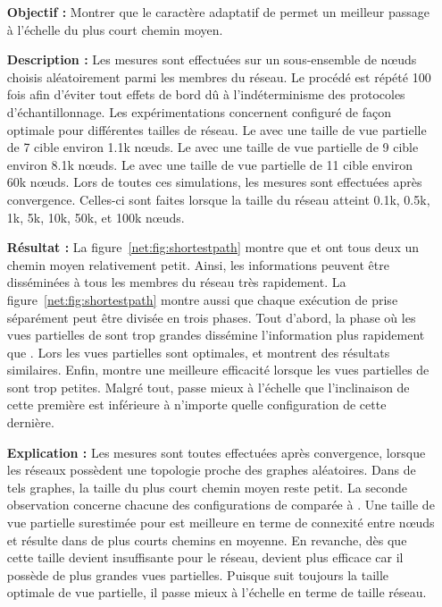 \begin{itemize}
\item [\textbf{Objectif :}] Montrer que le caractère adaptatif de \SPRAY permet
  un meilleur passage à l'échelle du plus court chemin moyen.
\item [\textbf{Description :}] Les mesures sont effectuées sur un sous-ensemble
  de nœuds choisis aléatoirement parmi les membres du réseau. Le procédé est
  répété 100 fois afin d'éviter tout effets de bord dû à l'indéterminisme des
  protocoles d'échantillonnage. Les expérimentations concernent \CYCLON
  configuré de façon optimale pour différentes tailles de réseau. Le \CYCLON
  avec une taille de vue partielle de 7 cible environ 1.1k nœuds. Le \CYCLON
  avec une taille de vue partielle de 9 cible environ 8.1k nœuds. Le \CYCLON
  avec une taille de vue partielle de 11 cible environ 60k nœuds. Lors de toutes
  ces simulations, les mesures sont effectuées après convergence. Celles-ci sont
  faites lorsque la taille du réseau atteint 0.1k, 0.5k, 1k, 5k, 10k, 50k, et
  100k nœuds.
\item [\textbf{Résultat :}] La figure~\ref{net:fig:shortestpath} montre que
  \CYCLON et \SPRAY ont tous deux un chemin moyen relativement petit. Ainsi, les
  informations peuvent être disséminées à tous les membres du réseau très
  rapidement. La figure~\ref{net:fig:shortestpath} montre aussi que chaque
  exécution de \CYCLON prise séparément peut être divisée en trois phases.  Tout
  d'abord, la phase où les vues partielles de \CYCLON sont trop grandes
  dissémine l'information plus rapidement que \SPRAY. Lors les vues partielles
  sont optimales, \CYCLON et \SPRAY montrent des résultats similaires. Enfin,
  \SPRAY montre une meilleure efficacité lorsque les vues partielles de \CYCLON
  sont trop petites. Malgré tout, \SPRAY passe mieux à l'échelle que \CYCLON
  l'inclinaison de cette première est inférieure à n'importe quelle
  configuration de cette dernière.
\item [\textbf{Explication :}] Les mesures sont toutes effectuées après
  convergence, lorsque les réseaux possèdent une topologie proche des graphes
  aléatoires.  Dans de tels graphes, la taille du plus court chemin moyen reste
  petit.  La seconde observation concerne chacune des configurations de \CYCLON
  comparée à \SPRAY. Une taille de vue partielle surestimée pour \CYCLON est
  meilleure en terme de connexité entre nœuds et résulte dans de plus courts
  chemins en moyenne. En revanche, dès que cette taille devient insuffisante
  pour le réseau, \SPRAY devient plus efficace car il possède de plus grandes
  vues partielles. Puisque \SPRAY suit toujours la taille optimale de vue
  partielle, il passe mieux à l'échelle en terme de taille réseau.
\end{itemize}

